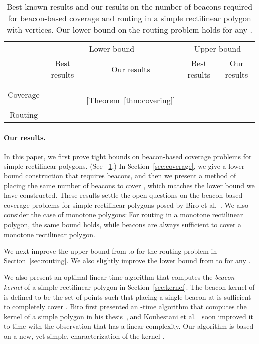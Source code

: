 \documentclass[11pt]{article}
\theoremstyle{definition}
\newcommand\Tstrut{\rule{0pt}{2.6ex}}       \newcommand\Bstrut{\rule[-1.1ex]{0pt}{0pt}}
\begin{document}
\begin{table}[tbh]
\centering
\begin{tabular}{c|c|c|c|c}
 \hline
 & \multicolumn{2}{c|}{Lower bound} & \multicolumn{2}{c}{Upper bound}  \Tstrut\Bstrut\\
 \cline{2-5}
 & Best results & Our results & Best results & Our results
 \Tstrut\Bstrut\\ 
  \hline\hline
 Coverage &  \quad\; \cite{bgikm-cccg-13}&
  \qquad\, [Theorem~\ref{thm:covering}] &  \quad\enspace\;\; \cite{bgikm-cccg-13} &  \qquad\quad{}
  \Tstrut\Bstrut\\ \hline
 Routing &   \enspace \cite{bgikm-cccg-13} &   &   \enspace \cite{bgikm-cccg-13} &   
  \Tstrut\Bstrut\\
 \hline
\end{tabular}
\caption{Best known results and our results on the number of beacons required for beacon-based coverage and routing in a simple rectilinear polygon  with  vertices. Our lower bound on the routing problem holds for any .}
\label{tbl:summary}
\end{table}

\paragraph{Our results.}

In this paper, we first prove tight bounds on beacon-based coverage problems for simple rectilinear polygons. (See \tablename~\ref{tbl:summary}.) 
In Section~\ref{sec:coverage},
we give a lower bound construction that requires  beacons, and then we present a method of placing the same number of beacons to cover , which matches the lower bound we have constructed.
These results settle the open questions on the beacon-based coverage problems for simple rectilinear polygons
posed by Biro et al.~\cite{bgikm-cccg-13}.
We also consider the case of monotone polygons:
For routing in a monotone rectilinear polygon, the same bound 
 holds,
while  beacons are always sufficient to cover a monotone rectilinear polygon.

We next improve the upper bound from  to  for
the routing problem in Section~\ref{sec:routing}. We also slightly improve the lower bound from  to  for any . 

We also present an optimal linear-time algorithm that computes the \emph{beacon kernel}
 of a simple rectilinear polygon  in Section~\ref{sec:kernel}.
The {beacon kernel}  of  is defined to be
the set of points  such that placing a single beacon at  is sufficient to completely cover .
Biro first presented an -time algorithm that computes the kernel 
of a simple polygon  in his thesis~\cite{b-bbrg-13},
and  Kouhestani et al.~\cite{krs-cccg-14} soon improved it to  time
with the observation that  has a linear complexity.
Our algorithm is based on a new, yet simple, characterization of the kernel .
\end{document}
